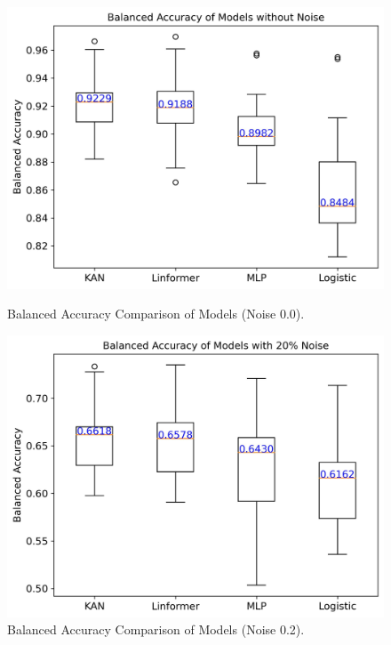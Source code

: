 \documentclass{article}
\begin{document}
\begin{figure}[ht]
    \centering
    \begin{minipage}{0.45\textwidth}
        \centering
        \includegraphics[width=\textwidth]{images/3_6w_0.0_24.jpg}
        \caption{Balanced Accuracy Comparison of Models (Noise 0.0).}
        \label{box0}
    \end{minipage}\hfill
    \begin{minipage}{0.45\textwidth}
        \centering
        \includegraphics[width=\textwidth]{images/4_6w_0.0_24_0.2.jpg}
        \caption{Balanced Accuracy Comparison of Models (Noise 0.2).}
        \label{box0.2}
    \end{minipage}
\end{figure}
\end{document}
